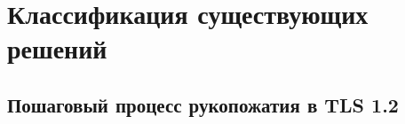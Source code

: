 \chapter{Классификация существующих \\ решений}\label{Classification}


\section{Пошаговый процесс рукопожатия в TLS 1.2}



